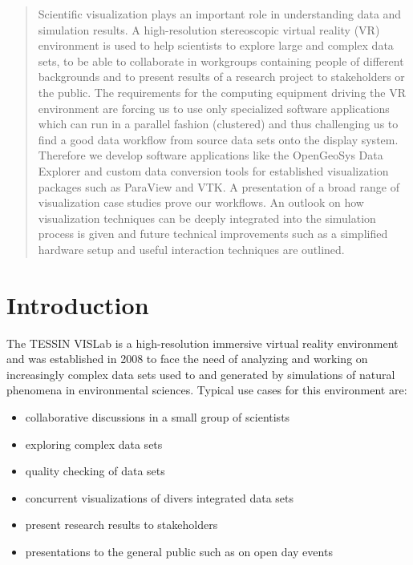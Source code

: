 \begin{abstract}
Scientific visualization plays an important role in understanding data
and simulation results. A high-resolution stereoscopic virtual reality
(VR) environment is used to help scientists to explore large and complex
data sets, to be able to collaborate in workgroups containing people of
different backgrounds and to present results of a research project to
stakeholders or the public. The requirements for the computing equipment
driving the VR environment are forcing us to use only specialized
software applications which can run in a parallel fashion (clustered)
and thus challenging us to find a good data workflow from source data
sets onto the display system. Therefore we develop software applications
like the OpenGeoSys Data Explorer and custom data conversion tools for
established visualization packages such as ParaView and VTK. A
presentation of a broad range of visualization case studies prove our
workflows. An outlook on how visualization techniques can be deeply
integrated into the simulation process is given and future technical
improvements such as a simplified hardware setup and useful interaction
techniques are outlined.
\end{abstract}


\section{Introduction}
\label{introduction}

The TESSIN VISLab is a high-resolution immersive virtual reality
environment and was established in 2008 to face the need of analyzing
and working on increasingly complex data sets used to and generated by
simulations of natural phenomena in environmental sciences. Typical use
cases for this environment are:

\begin{itemize}
\itemsep1pt\parskip0pt
\item
  collaborative discussions in a small group of scientists
\item
  exploring complex data sets
\item
  quality checking of data sets
\item
  concurrent visualizations of divers integrated data sets
\item
  present research results to stakeholders
\item
  presentations to the general public such as on open day events
\end{itemize}

